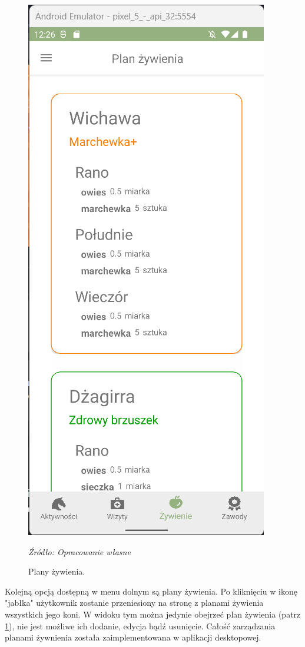 \documentclass[12pt,twoside]{report}
\begin{document}
\newpage
\begin{figure}
	\centering
	\includegraphics[scale=0.7]{NutritionPlan}
	\caption{\centering Plany żywienia.}
	\textit{Źródło: Opracowanie własne}
	\label{NutritionPlan}
\end{figure}
Kolejną opcją dostępną w menu dolnym są plany żywienia. Po kliknięciu w ikonę "jabłka" użytkownik zostanie przeniesiony na stronę z planami żywienia wszystkich jego koni. W widoku tym można jedynie obejrzeć plan żywienia (patrz \ref{NutritionPlan}), nie jest możliwe ich dodanie, edycja bądź usunięcie. Całość zarządzania planami żywnienia została zaimplementowana w aplikacji desktopowej.
\end{document}
